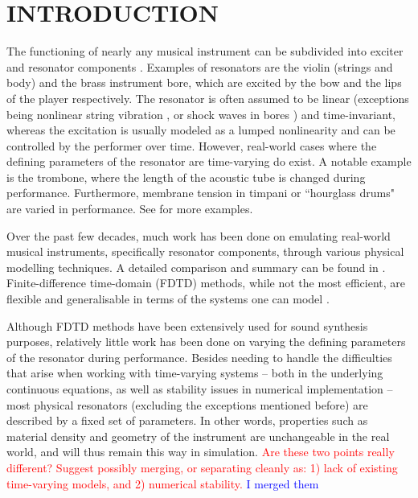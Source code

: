\documentclass[fleqn]{jaes}
\def\SBcomment[#1]{\textcolor{red}{#1}}
\def\SWcomment[#1]{\textcolor{blue}{#1}}
\begin{document}
\section{INTRODUCTION}\label{sec:introduction}

The functioning of nearly any musical instrument can be subdivided into exciter and resonator components \cite{mcintyre1983oscillations, Borin1989}. Examples of resonators are the violin (strings and body) and the brass instrument bore, which are excited by the bow and the lips of the player respectively. The resonator is often assumed to be linear (exceptions being nonlinear string vibration \cite{Carrier1945}, or shock waves in bores \cite{Hirschberg1996, Msallam2000, Vergez2000}) and time-invariant, whereas the excitation is usually modeled as a lumped nonlinearity and can be controlled by the performer over time. However, real-world cases where the defining parameters of the resonator are time-varying do exist.
A notable example is the trombone, where the length of the acoustic tube is changed during performance. Furthermore, membrane tension in timpani or ``hourglass drums" %
are varied in performance. %
See \cite[Sec. 12.4]{Willemsen2021Thesis} for more examples. 

Over the past few decades, much work has been done on emulating real-world musical instruments, specifically resonator components, through various physical modelling techniques. A detailed comparison and summary can be found in \cite{valimaki2005discrete}. Finite-difference time-domain (FDTD) methods, while not the most efficient, are flexible and generalisable in terms of the systems one can model \cite{Bilbao2009}.

Although FDTD methods have been extensively used for sound synthesis purposes, relatively little work has been done on varying the defining parameters of the resonator during performance. Besides needing to handle the difficulties that arise when working with time-varying systems -- both in the underlying continuous equations, as well as stability issues in numerical implementation -- most physical resonators (excluding the exceptions mentioned before) are described by a fixed set of parameters. In other words, properties such as material density and geometry of the instrument are unchangeable in the real world, and will thus remain this way in simulation. %
\SBcomment[Are these two points really different? Suggest possibly merging, or separating cleanly as: 1) lack of existing time-varying models, and 2) numerical stability.] \SWcomment[I merged them]%
\end{document}
